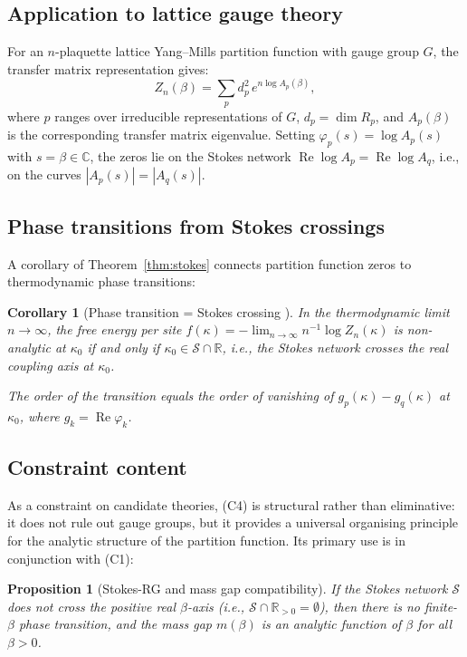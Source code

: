 \documentclass[12pt]{article}
\newtheorem{proposition}[theorem]{Proposition}
\newtheorem{corollary}[theorem]{Corollary}
\theoremstyle{definition}
\theoremstyle{remark}
\newcommand{\re}{\operatorname{Re}}
\newcommand{\R}{\mathbb{R}}
\newcommand{\C}{\mathbb{C}}
\begin{document}
\subsection{Application to lattice gauge theory}

For an $n$-plaquette lattice Yang--Mills partition function with
gauge group $G$, the transfer matrix representation gives:
\[
  Z_n(\beta) = \sum_p d_p^2\,e^{n\log A_p(\beta)},
\]
where $p$ ranges over irreducible representations of $G$,
$d_p = \dim R_p$, and $A_p(\beta)$ is the corresponding
transfer matrix eigenvalue.  Setting
$\varphi_p(s) = \log A_p(s)$ with $s = \beta \in \C$, the
zeros lie on the Stokes network
$\re\log A_p = \re\log A_q$, i.e., on the curves
$|A_p(s)| = |A_q(s)|$.

\subsection{Phase transitions from Stokes crossings}

A corollary of Theorem~\ref{thm:stokes} connects partition
function zeros to thermodynamic phase transitions:

\begin{corollary}[Phase transition = Stokes crossing {\cite[Cor.~2]{OlbrykPsi2026}}]
\label{cor:phase_transition}
In the thermodynamic limit $n \to \infty$, the free energy per
site $f(\kappa) = -\lim_{n \to \infty} n^{-1}\log Z_n(\kappa)$
is non-analytic at $\kappa_0$ if and only if
$\kappa_0 \in \mathcal{S} \cap \R$, i.e., the Stokes network
crosses the real coupling axis at $\kappa_0$.

The order of the transition equals the order of vanishing of
$g_p(\kappa) - g_q(\kappa)$ at $\kappa_0$, where $g_k = \re\varphi_k$.
\end{corollary}

\subsection{Constraint content}

As a constraint on candidate theories, (C4) is structural rather
than eliminative: it does not rule out gauge groups, but it provides
a universal organising principle for the analytic structure of the
partition function.  Its primary use is in conjunction with (C1):

\begin{proposition}[Stokes-RG and mass gap compatibility]
\label{prop:stokes_mass}
If the Stokes network $\mathcal{S}$ does not cross the positive
real $\beta$-axis (i.e., $\mathcal{S} \cap \R_{>0} = \emptyset$),
then there is no finite-$\beta$ phase transition, and the mass gap
$m(\beta)$ is an analytic function of $\beta$ for all $\beta > 0$.
\end{proposition}
\end{document}
